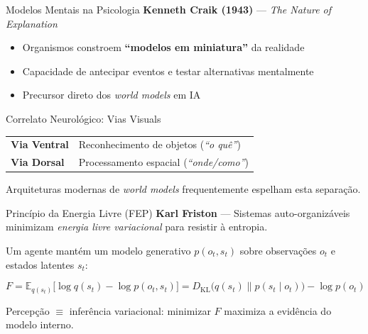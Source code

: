 \documentclass[aspectratio=169]{beamer}
\begin{document}
\begin{frame}{Modelos Mentais na Psicologia}
  \textbf{Kenneth Craik (1943)} --- \textit{The Nature of Explanation}
  \vspace{0.5em}
  \begin{itemize}
    \item Organismos constroem \textbf{``modelos em miniatura''} da realidade
    \item Capacidade de antecipar eventos e testar alternativas mentalmente
    \item Precursor direto dos \textit{world models} em IA
  \end{itemize}
  \vspace{1em}
  \begin{block}{Correlato Neurológico: Vias Visuals}
    \begin{tabularx}{\textwidth}{lX}
      \textbf{Via Ventral} & Reconhecimento de objetos (\textit{``o quê''}) \\
      \textbf{Via Dorsal}  & Processamento espacial (\textit{``onde/como''}) \\
    \end{tabularx}
  \end{block}
  \vspace{0.3em}
  \centering\small Arquiteturas modernas de \textit{world models} frequentemente espelham esta separação.
\end{frame}

\begin{frame}{Princípio da Energia Livre (FEP)}
  \textbf{Karl Friston} --- Sistemas auto-organizáveis minimizam \textit{energia livre variacional} para resistir à entropia.

  \vspace{0.5em}
  Um agente mantém um modelo generativo $p(o_t, s_t)$ sobre observações $o_t$ e estados latentes $s_t$:

  \vspace{0.3em}
  \begin{equation}
    F = \mathbb{E}_{q(s_t)}\bigl[\log q(s_t) - \log p(o_t, s_t)\bigr]
      = D_{\mathrm{KL}}\bigl(q(s_t) \parallel p(s_t \mid o_t)\bigr) - \log p(o_t)
  \end{equation}

  \vspace{0.3em}
  Percepção $\equiv$ inferência variacional: minimizar $F$ maximiza a evidência do modelo interno.
\end{frame}
\end{document}
